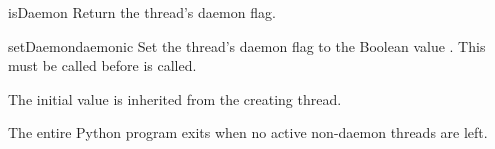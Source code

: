 \begin{methoddesc}{isDaemon}{}
Return the thread's daemon flag.
\end{methoddesc}

\begin{methoddesc}{setDaemon}{daemonic}
Set the thread's daemon flag to the Boolean value .
This must be called before  is called.

The initial value is inherited from the creating thread.

The entire Python program exits when no active non-daemon
threads are left.
\end{methoddesc}

